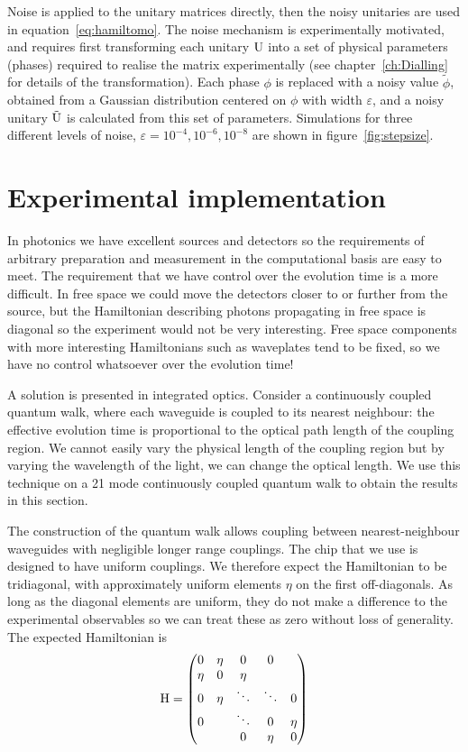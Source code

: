 Noise is applied to the unitary matrices directly, then the noisy unitaries
are used in equation~\ref{eq:hamiltomo}. The noise mechanism is experimentally
motivated, and requires first transforming each unitary \(\mathrm{U}\) into a set
of physical parameters (phases) required to realise the matrix experimentally
(see chapter~\ref{ch:Dialling} for details of the transformation). Each phase
\(\phi\) is replaced with a noisy value \(\tilde{\phi}\), obtained from a
Gaussian distribution centered on \(\phi\) with width \(\varepsilon\), and a
noisy unitary \(\tilde{\mathrm{U}}\) is calculated from this set of parameters.
Simulations for three different levels of noise, \(\varepsilon=10^{-4}, 10^{-6},
10^{-8}\) are shown in figure~\ref{fig:stepsize}.

\section{Experimental implementation}
\label{sec:HTExperiment}
In photonics we have excellent sources \cite{sources-kwiat,
sources-josh} and detectors \cite{detectors-yale, detectors-sprengers} so the
requirements of arbitrary preparation and measurement in the computational basis
are easy to meet. The requirement that we have control over the evolution time
is a more difficult. In free space we could move the detectors closer to or
further from the source, but the Hamiltonian describing photons propagating in
free space is diagonal so the experiment would not be very interesting. Free
space components with more interesting Hamiltonians such as waveplates tend to
be fixed, so we have no control whatsoever over the evolution time!

A solution is presented in integrated optics. Consider a continuously coupled
quantum walk, where each waveguide is coupled to its nearest neighbour: the
effective evolution time is proportional to the optical path length of the
coupling region. We cannot easily vary the physical length of the coupling
region \cite{walks-jasmin} but by varying the wavelength of the light, we can
change the optical length. We use this technique on a 21 mode continuously
coupled quantum walk to obtain the results in this section.

The construction of the quantum walk allows coupling between nearest-neighbour
waveguides with negligible longer range couplings. The chip that we use is
designed to have uniform couplings. We therefore expect the Hamiltonian to be
tridiagonal, with approximately uniform elements \(\eta\) on the first
off-diagonals. As long as the diagonal elements are uniform, they do not make a
difference to the experimental observables so we can treat these as zero without
loss of generality. The expected Hamiltonian is
\begin{equation}
  \mathrm{H} = \begin{pmatrix}
  0 & \eta & 0 & 0 \\
  \eta & 0 & \eta \\
  0 & \eta & \ddots & \ddots & 0 \\
  0 & & \ddots & 0 & \eta \\
  & & 0 & \eta & 0
  \end{pmatrix}
\end{equation}

